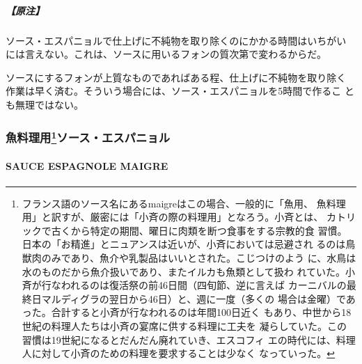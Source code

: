 \begin{recette}
\hypertarget{ux539fux6ce8}{%
\subparagraph{【原注】}\label{ux539fux6ce8}}

ソース・エスパニョルで仕上げに不純物を取り除くのにかかる時間はいちがい
には言えない。これは、ソースに用いるフォンの質次第で変わるからだ。

ソースにするフォンが上質なものであればある程、仕上げに不純物を取り除く
作業は早く済む。そういう場合には、ソース・エスパニョルを5時間で作るこ
とも無理ではない。

\maeaki

\hypertarget{ux9b5aux6599ux7406ux75280102006ux30bdux30fcux30b9ux30a8ux30b9ux30d1ux30cbux30e7ux30eb}{%
\subsubsection[魚料理用ソース・エスパニョル]{\texorpdfstring{魚料理用\footnote{フランス語のソース名にあるmaigreはこの場合、一般的に「魚用、
  魚料理用」と訳すが、厳密には「小斉の際の料理用」となろう。小斉とは、
  カトリックで古くから特定の期間、曜日に肉類を断つ食事をする宗教的食
  習慣。日本の「お精進」とニュアンスは近いが、小斉においては忌避され
  るのは鳥獣肉のみであり、魚介や乳製品はいいとされた。こじつけのよう
  に、水鳥は水のものだから魚介扱いであり、またイルカも魚類として扱わ
  れていた。小斉が行なわれるのは復活祭の前46日間（四旬節、逆に言えば
  カーニバルの最終日マルディグラの翌日から46日）と、週に一度（多くの
  場合は金曜）であった。合計すると小斉が行なわれるのは年間100日近く
  もあり、中世から18世紀の料理人たちは小斉の宴席に供する料理に工夫を
  凝らしていた。この習慣は19世紀になるとだんだん廃れていき、エスコフィ
  エの時代には、料理人に対して小斉のための料理を要求することは少なく
  なっていった。}ソース・エスパニョル}{魚料理用ソース・エスパニョル}}\label{ux9b5aux6599ux7406ux75280102006ux30bdux30fcux30b9ux30a8ux30b9ux30d1ux30cbux30e7ux30eb}}

\hypertarget{sauce-espagnole-maigre}{%
\paragraph{SAUCE ESPAGNOLE MAIGRE}\label{sauce-espagnole-maigre}}



\end{recette}
